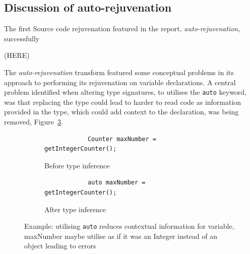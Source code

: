 \documentclass[bsc,frontabs,singlespacing,twoside,parskip,deptreport]{infthesis}
\begin{document}
\subsection{Discussion of auto-rejuvenation}

The first Source code rejuvenation featured in the report, \textit{auto-rejuvenation}, successfully 

(HERE)

The \textit{auto-rejuvenation} transform featured some conceptual problems in its approach to performing its rejuvenation on variable declarations. A central problem identified when altering type signatures, to utilises the \texttt{auto} keyword, was that replacing the type could lead to harder to read code as information provided in the type, which could add context to the declaration, was being removed, Figure~\ref{fig:reduce-info-auto}. 

\begin{figure}[H]
    \centering
    \begin{subfigure}[h]{\textwidth}
        \centering
        \begin{verbatim}
            Counter maxNumber = getIntegerCounter();
        \end{verbatim}
        \caption{Before type inference}
        \label{fig:type-context-before}
        \vspace{0.40cm}
    \end{subfigure}
    
    \begin{subfigure}[h]{\textwidth}
        \begin{verbatim}
            auto maxNumber = getIntegerCounter();
        \end{verbatim}
        \caption{After type inference }
        \centering
        \label{fig:type-context-after}
    \end{subfigure}

    \caption{Example: utilising \texttt{auto} reduces contextual information for variable, maxNumber maybe utilise as if it was an Integer instead of an object leading to errors}
    \label{fig:reduce-info-auto}
\end{figure}

\end{document}
